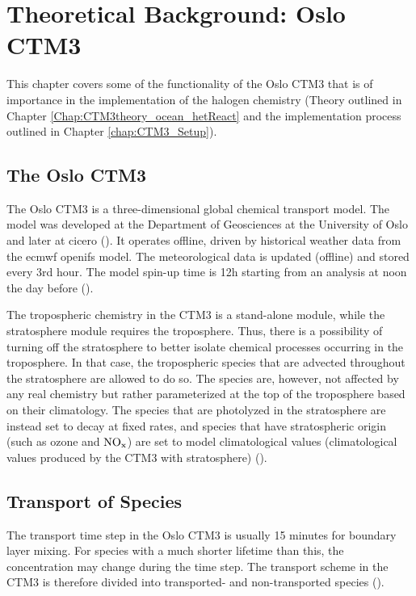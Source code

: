 \setcounter{chapter}{3}
\chapter{Theoretical Background: Oslo CTM3}\label{chapt:OsloCTM3}

This chapter covers some of the functionality of the Oslo CTM3 that is of importance in the implementation of the halogen chemistry (Theory outlined in Chapter \ref{Chap:CTM3theory_ocean_hetReact} and the implementation process outlined in Chapter \ref{chap:CTM3_Setup}).

\section{The Oslo CTM3}

The Oslo CTM3 is a three-dimensional global chemical transport model. The model was developed at the Department of Geosciences at the University of Oslo and later at \acrfull{cicero} (\cite{SovdeManual}). It operates offline, driven by historical weather data from the \acrfull{ecmwf} \acrfull{openifs} model. The meteorological data is updated (offline) and stored every 3rd hour. The model spin-up time is 12h starting from an analysis at noon the day before (\cite{Sovde2012}). 

\medskip

The tropospheric chemistry in the CTM3 is a stand-alone module, while the stratosphere module requires the troposphere. Thus, there is a possibility of turning off the stratosphere to better isolate chemical processes occurring in the troposphere. In that case, the tropospheric species that are advected throughout the stratosphere are allowed to do so. The species are, however, not affected by any real chemistry but rather parameterized at the top of the troposphere based on their climatology. The species that are photolyzed in the stratosphere are instead set to decay at fixed rates, and species that have stratospheric origin (such as ozone and $\mathrm{NO_x}$) are set to model climatological values (climatological values produced by the CTM3 with stratosphere) (\cite{Sovde2012}).

\section{Transport of Species}\label{sec:CTM3_transport}

The transport time step in the Oslo CTM3 is usually 15 minutes for boundary layer mixing. For species with a much shorter lifetime than this, the concentration may change during the time step. The transport scheme in the CTM3 is therefore divided into transported- and non-transported species (\cite{SovdeManual}).

